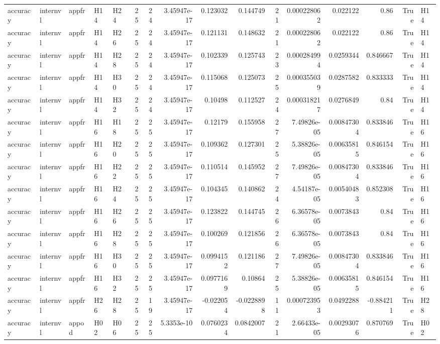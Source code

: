 \begin{longtable}{lllllrrrrrrrrrrl}
accuracy & internvl & appfr & H14 & H24 & 25 & 24 & 3.45947e-17 & 0.123032 & 0.144749 & 21 & 0.000228062 & 0.022122 & 0.86 & True & H14 \\
accuracy & internvl & appfr & H14 & H26 & 25 & 24 & 3.45947e-17 & 0.121131 & 0.148632 & 21 & 0.000228062 & 0.022122 & 0.86 & True & H14 \\
accuracy & internvl & appfr & H14 & H28 & 25 & 24 & 3.45947e-17 & 0.102339 & 0.125743 & 23 & 0.000284994 & 0.0259344 & 0.846667 & True & H14 \\
accuracy & internvl & appfr & H14 & H30 & 25 & 24 & 3.45947e-17 & 0.115068 & 0.125073 & 25 & 0.000355039 & 0.0287582 & 0.833333 & True & H14 \\
accuracy & internvl & appfr & H14 & H32 & 25 & 24 & 3.45947e-17 & 0.10498 & 0.112527 & 24 & 0.000318217 & 0.0276849 & 0.84 & True & H14 \\
accuracy & internvl & appfr & H16 & H18 & 25 & 25 & 3.45947e-17 & 0.12179 & 0.155958 & 27 & 7.49826e-05 & 0.00847304 & 0.833846 & True & H16 \\
accuracy & internvl & appfr & H16 & H20 & 25 & 25 & 3.45947e-17 & 0.109362 & 0.127301 & 25 & 5.38826e-05 & 0.00635815 & 0.846154 & True & H16 \\
accuracy & internvl & appfr & H16 & H22 & 25 & 25 & 3.45947e-17 & 0.110514 & 0.145952 & 27 & 7.49826e-05 & 0.00847304 & 0.833846 & True & H16 \\
accuracy & internvl & appfr & H16 & H24 & 25 & 25 & 3.45947e-17 & 0.104345 & 0.140862 & 24 & 4.54187e-05 & 0.00540483 & 0.852308 & True & H16 \\
accuracy & internvl & appfr & H16 & H26 & 25 & 25 & 3.45947e-17 & 0.123822 & 0.144745 & 26 & 6.36578e-05 & 0.0073843 & 0.84 & True & H16 \\
accuracy & internvl & appfr & H16 & H28 & 25 & 25 & 3.45947e-17 & 0.100269 & 0.121856 & 26 & 6.36578e-05 & 0.0073843 & 0.84 & True & H16 \\
accuracy & internvl & appfr & H16 & H30 & 25 & 25 & 3.45947e-17 & 0.0994152 & 0.121186 & 27 & 7.49826e-05 & 0.00847304 & 0.833846 & True & H16 \\
accuracy & internvl & appfr & H16 & H32 & 25 & 25 & 3.45947e-17 & 0.0977169 & 0.10864 & 25 & 5.38826e-05 & 0.00635815 & 0.846154 & True & H16 \\
accuracy & internvl & appfr & H26 & H28 & 25 & 19 & 3.45947e-17 & -0.022054 & -0.0228898 & 11 & 0.000723953 & 0.0492288 & -0.884211 & True & H28 \\
accuracy & internvl & appod & H02 & H06 & 25 & 25 & 5.3353e-10 & 0.0760234 & 0.0842007 & 21 & 2.66433e-05 & 0.00293076 & 0.870769 & True & H02 \\

\end{longtable}
